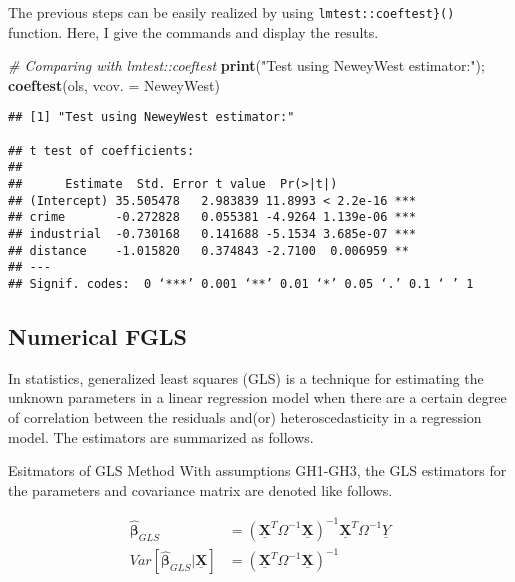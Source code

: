 \documentclass[
  12pt,
]{article}
\newenvironment{Shaded}{\begin{snugshade}}{\end{snugshade}}
\newcommand{\CommentTok}[1]{\textcolor[rgb]{0.56,0.35,0.01}{\textit{#1}}}
\newcommand{\DataTypeTok}[1]{\textcolor[rgb]{0.13,0.29,0.53}{#1}}
\newcommand{\KeywordTok}[1]{\textcolor[rgb]{0.13,0.29,0.53}{\textbf{#1}}}
\newcommand{\NormalTok}[1]{#1}
\newcommand{\StringTok}[1]{\textcolor[rgb]{0.31,0.60,0.02}{#1}}
\begin{document}
The previous steps can be easily realized by using \texttt{lmtest::coeftest\}()} function. Here, I give the commands and display the results.

\begin{Shaded}
\begin{Highlighting}[]
\CommentTok{\# Comparing with lmtest::coeftest }
\KeywordTok{print}\NormalTok{(}\StringTok{"Test using NeweyWest estimator:"}\NormalTok{); }\KeywordTok{coeftest}\NormalTok{(ols, }\DataTypeTok{vcov. =}\NormalTok{ NeweyWest)}
\end{Highlighting}
\end{Shaded}

\begin{Verbatim}
## [1] "Test using NeweyWest estimator:"

## t test of coefficients:
## 
##      Estimate  Std. Error t value  Pr(>|t|)    
## (Intercept) 35.505478   2.983839 11.8993 < 2.2e-16 ***
## crime       -0.272828   0.055381 -4.9264 1.139e-06 ***
## industrial  -0.730168   0.141688 -5.1534 3.685e-07 ***
## distance    -1.015820   0.374843 -2.7100  0.006959 ** 
## ---
## Signif. codes:  0 ‘***’ 0.001 ‘**’ 0.01 ‘*’ 0.05 ‘.’ 0.1 ‘ ’ 1
\end{Verbatim}

\hypertarget{numerical-fgls}{%
\subsection{Numerical FGLS}\label{numerical-fgls}}

In statistics, generalized least squares (GLS) is a technique for estimating the unknown parameters in a linear regression model when there are a certain degree of correlation between the residuals and(or) heteroscedasticity in a regression model. The estimators are summarized as follows.

\begin{itembox}[1]{Esitmators of GLS Method}
With assumptions GH1-GH3, the GLS estimators for the parameters and covariance matrix are denoted like follows.

\begin{align*}
    \hat{\mathbf{\beta}}_{GLS} & = \left(\underline{\mathbf{X}}^{T} \Omega^{-1} \underline{\mathbf{X}} \right)^{-1} \underline{\mathbf{X}}^{T} \Omega^{-1} \underline{Y}\\
    Var[\hat{\mathbf{\beta}}_{GLS} | \underline{\mathbf{X}}] & = \left(\underline{\mathbf{X}}^{T} \Omega^{-1} \underline{\mathbf{X}} \right)^{-1}
\end{align*}

\end{itembox}
\end{document}
